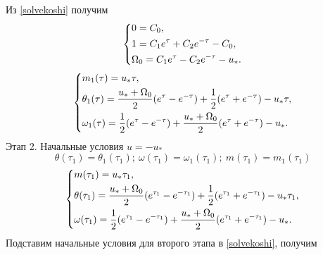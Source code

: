 \documentclass[a4paper,14pt]{article}
\theoremstyle{plain} %
\theoremstyle{definition} %
\theoremstyle{remark} %
\begin{document}
{Из \eqref{solvekoshi} получим
\begin{equation}\label{stage11}
    \left\{ {\begin{aligned}
                 & 0 = C_0, \hfill                                            \\
                 & 1 = C_1e^\tau+C_2e^{-\tau}-C_0 , \hfill \\
                 & \Omega_0 = C_1e^\tau-C_2e^{-\tau}-u_*  . \hfill        \\
            \end{aligned}} \right.
\end{equation}
\begin{equation}\label{solvefull1stage}
    \left\{ {\begin{aligned}
                 & m_1(\tau) = u_*\tau, \hfill                                                                              \\
                 & \theta_1(\tau) = \frac{u_*+\Omega_0}{2}(e^\tau-e^{-\tau})+\frac{1}{2}(e^\tau+e^{-\tau})-u_*\tau , \hfill \\
                 & \omega_1(\tau) = \frac{1}{2}(e^\tau-e^{-\tau})+\frac{u_*+\Omega_0}{2}(e^\tau+e^{-\tau})-u_*  . \hfill    \\
            \end{aligned}} \right.
\end{equation}
Этап 2. Начальные условия $u=-u_*$
\[
    \theta(\tau_1)=\theta_1(\tau_1);\ \omega(\tau_1)=\omega_1(\tau_1);\ m(\tau_1)=m_1(\tau_1)
\]
\begin{equation}\label{basecond2stage}
    \left\{ {\begin{aligned}
                 & m(\tau_1) = u_*\tau_1, \hfill                                                                                          \\
                 & \theta(\tau_1) = \frac{u_*+\Omega_0}{2}(e^{\tau_1}-e^{-\tau_1})+\frac{1}{2}(e^{\tau_1}+e^{-\tau_1})-u_*\tau_1 , \hfill \\
                 & \omega(\tau_1) = \frac{1}{2}(e^{\tau_1}-e^{-\tau_1})+\frac{u_*+\Omega_0}{2}(e^{\tau_1}+e^{-\tau_1})-u_*  . \hfill      \\
            \end{aligned}} \right.
\end{equation}
Подставим начальные условия для второго этапа в \eqref{solvekoshi}, получим

}
\end{document}
